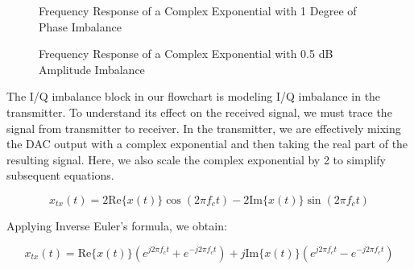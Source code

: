 \documentclass{article}
\begin{document}
\begin{figure}[H]
	\centerline{}
	\caption{Frequency Response of a Complex Exponential with 1 Degree of Phase Imbalance}
	\label{fig::iq_imbalance_0_mag_1_phase_freq}
\end{figure}

\begin{figure}[H]
	\centerline{}
	\caption{Frequency Response of a Complex Exponential with 0.5 dB Amplitude Imbalance}
	\label{fig::iq_imbalance_0p5_mag_0_phase_freq}
\end{figure}

The I/Q imbalance block in our flowchart is modeling I/Q imbalance in the transmitter. To understand its effect on the received signal, we must trace the signal from transmitter to receiver. In the transmitter, we are effectively mixing the DAC output with a complex exponential and then taking the real part of the resulting signal. Here, we also scale the complex exponential by 2 to simplify subsequent equations.

\begin{equation}
	x_{tx}(t) = 2\text{Re}\{x(t)\}\cos(2{\pi}f_ct) - 2\text{Im}\{x(t)\}\sin(2{\pi}f_ct)
\end{equation}

Applying Inverse Euler's formula, we obtain:

\begin{equation}
	x_{tx}(t) = \text{Re}\{x(t)\}(e^{j2{\pi}f_ct} + e^{-j2{\pi}f_ct}) + j\text{Im}\{x(t)\}(e^{j2{\pi}f_ct} - e^{-j2{\pi}f_ct})
\end{equation}
\end{document}
